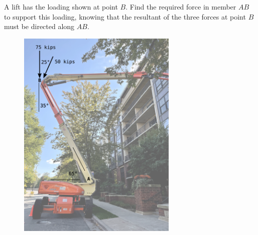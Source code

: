 
A lift has the loading shown at point $B$.  Find the required force in member $AB$ to support this loading, knowing that the resultant of the three forces at point $B$ must be directed along $AB$.

\begin{figure}[ht!]
  \centering
  \includegraphics[width=3.0in]{fig.png}
\end{figure}

